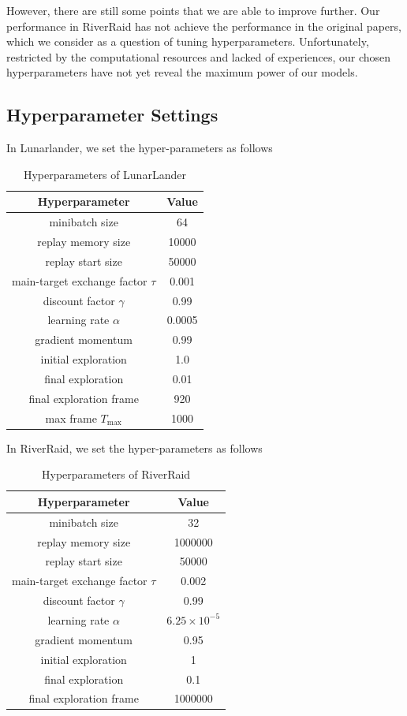 \documentclass[12pt]{article}
\begin{document}
However, there are still some points that we are able to improve further. Our performance in RiverRaid has not achieve the performance in the original papers, which we consider as a question of tuning hyperparameters. Unfortunately, restricted by the computational resources and lacked of experiences, our chosen hyperparameters have not yet reveal the maximum power of our models. 

\newpage
\appendixpage
\addappheadtotoc
\begin{appendices}
\section{Hyperparameter Settings}\label{hyper}
In Lunarlander, we set the hyper-parameters as follows
\begin{table}[H]
    \caption{\label{tab:lunar-hyper}Hyperparameters of LunarLander}
    \centering
    \begin{tabular}{cc}
    \toprule
    Hyperparameter & Value\\
    \midrule
     minibatch size & 64\\
     replay memory size & 10000\\
     replay start size & 50000\\
     main-target exchange factor $\tau$ & 0.001\\
     discount factor $\gamma$ & 0.99\\
     learning rate $\alpha$ & 0.0005\\
     gradient momentum & 0.99\\
     initial exploration & 1.0\\
     final exploration & 0.01\\
     final exploration frame & 920\\
     max frame $T_{\mathrm{max}}$ & 1000\\
    \bottomrule
    \end{tabular}
\end{table}

In RiverRaid, we set the hyper-parameters as follows
\begin{table}[H]
    \caption{\label{tab:river-hyper}Hyperparameters of RiverRaid}
    \centering
    \begin{tabular}{cc}
    \toprule
    Hyperparameter & Value\\
    \midrule
     minibatch size & 32\\
     replay memory size & 1000000\\
     replay start size & 50000\\
     main-target exchange factor $\tau$ & 0.002\\
     discount factor $\gamma$ & 0.99\\
     learning rate $\alpha$ & $6.25 \times 10^{-5}$\\
     gradient momentum & 0.95\\
     initial exploration & 1\\
     final exploration & 0.1\\
     final exploration frame & 1000000\\
     

\end{tabular}
\end{table}
\end{appendices}
\end{document}
